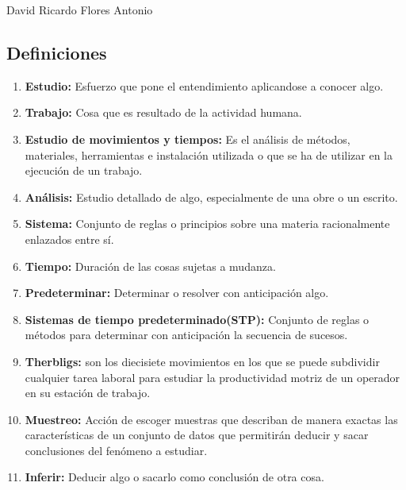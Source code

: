 David Ricardo Flores Antonio
\subsection{Definiciones}

\begin{enumerate}
    \item \textbf{Estudio:} Esfuerzo que pone el entendimiento aplicandose a conocer algo.
    \item \textbf{Trabajo:} Cosa que es resultado de la actividad humana.
    \item \textbf{Estudio de movimientos y tiempos:} Es el análisis de métodos, materiales, herramientas e instalación utilizada o que se ha de utilizar en la ejecución de un trabajo.
    \item \textbf{Análisis:} Estudio detallado de algo, especialmente de una obre o un escrito.
    \item \textbf{Sistema:} Conjunto de reglas o principios sobre una materia racionalmente enlazados entre sí.
    \item \textbf{Tiempo:} Duración de las cosas sujetas a mudanza.
    \item \textbf{Predeterminar:} Determinar o resolver con anticipación algo.
    \item \textbf{Sistemas de tiempo predeterminado(STP):} Conjunto de reglas o métodos para determinar con anticipación la secuencia de sucesos.
    \item \textbf{Therbligs:} son los diecisiete movimientos en los que se puede subdividir cualquier tarea laboral para estudiar la productividad motriz de un operador en su estación de trabajo.
    \item \textbf{Muestreo:} Acción de escoger muestras que describan de manera exactas las características de un conjunto de datos que permitirán deducir y sacar conclusiones del fenómeno a estudiar.
    \item \textbf{Inferir:} Deducir algo o sacarlo como conclusión de otra cosa.
\end{enumerate}